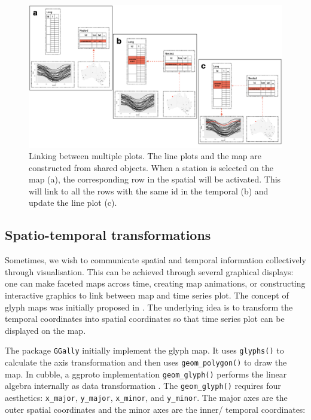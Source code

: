\documentclass[
  shortnames]{jss}
\begin{document}
\begin{CodeChunk}
\begin{figure}

{\centering \includegraphics[width=1\linewidth,height=0.35\textheight]{../figures/diagram-keynotes/diagram-keynotes.002} 

}

\caption{Linking between multiple plots. The line plots and the map are constructed from shared  objects. When a station is selected on the map (a), the corresponding row in the spatial  will be activated. This will link to all the rows with the same id in the temporal  (b) and update the line plot (c).}\label{fig:illu-interactive}
\end{figure}
\end{CodeChunk}

\hypertarget{st_transformation}{%
\subsection{Spatio-temporal transformations}\label{st_transformation}}

Sometimes, we wish to communicate spatial and temporal information collectively through visualisation. This can be achieved through several graphical displays: one can make faceted maps across time, creating map animations, or constructing interactive graphics to link between map and time series plot. The concept of glyph maps was initially proposed in \citet{Wickham2012-yr}. The underlying idea is to transform the temporal coordinates into spatial coordinates so that time series plot can be displayed on the map.

The package \texttt{GGally} initially implement the glyph map. It uses \texttt{glyphs()} to calculate the axis transformation and then uses \texttt{geom\_polygon()} to draw the map. In cubble, a ggproto implementation \texttt{geom\_glyph()} performs the linear algebra internally as data transformation . The \texttt{geom\_glyph()} requires four aesthetics: \texttt{x\_major}, \texttt{y\_major}, \texttt{x\_minor}, and \texttt{y\_minor}. The major axes are the outer spatial coordinates and the minor axes are the inner/ temporal coordinates:
\end{document}
